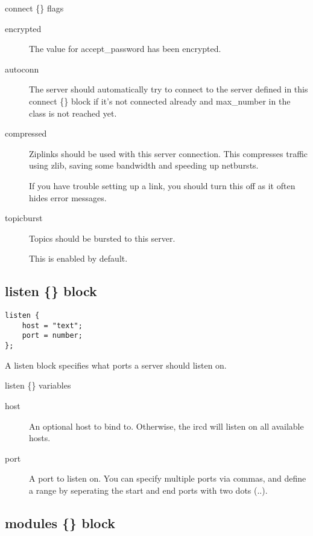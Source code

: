 {\sc connect \{\} flags}
\nopagebreak

\noindent
\begin{description}
\item[{encrypted}]
	The value for accept\_password has been encrypted.

\item[{autoconn}]
	The server should automatically try to connect to the server defined
	in this connect \{\} block if it's not connected already and
	max\_number in the class is not reached yet.

\item[{compressed}]
	Ziplinks should be used with this server connection.
	This compresses traffic using zlib, saving some bandwidth
	and speeding up netbursts.

	If you have trouble setting up a link, you should
	turn this off as it often hides error messages.

\item[{topicburst}]
	Topics should be bursted to this server.

This is enabled by default.
\end{description}


\subsection{listen \{\} block}

\begin{verbatim}
listen {
	host = "text";
	port = number;
};\end{verbatim}

	A listen block specifies what ports a server should listen on.


{\sc listen \{\} variables}
\nopagebreak

\noindent
\begin{description}
\item[{host}]
	An optional host to bind to. Otherwise, the ircd will listen on all
	available hosts.

\item[{port}]
	A port to listen on. You can specify multiple ports via commas, and
	define a range by seperating the start and end ports with two dots
	(..).

\end{description}

\subsection{modules \{\} block}

